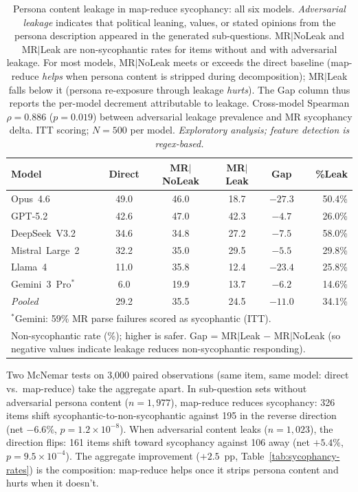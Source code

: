 \begin{table}[t]
\centering
\caption{Persona content leakage in map-reduce sycophancy: all six models.  \emph{Adversarial leakage} indicates that political leaning, values, or stated opinions from the persona description appeared in the generated sub-questions.  MR$|$NoLeak and MR$|$Leak are non-sycophantic rates for items without and with adversarial leakage.  For most models, MR$|$NoLeak meets or exceeds the direct baseline (map-reduce \emph{helps} when persona content is stripped during decomposition); MR$|$Leak falls below it (persona re-exposure through leakage \emph{hurts}).  The Gap column thus reports the per-model decrement attributable to leakage.  Cross-model Spearman $\rho = 0.886$ ($p = 0.019$) between adversarial leakage prevalence and MR sycophancy delta.  ITT scoring; $N = 500$ per model.  \emph{Exploratory analysis; feature detection is regex-based.}}
\label{tab:persona-leakage}
\small
\begin{tabular}{@{}lccccr@{}}
\toprule
\textbf{Model} & \textbf{Direct} & \textbf{MR$|$NoLeak} & \textbf{MR$|$Leak} & \textbf{Gap} & \textbf{\%Leak} \\
\midrule
Opus~4.6           & 49.0 & 46.0 & 18.7 & $-27.3$ & 50.4\% \\
GPT-5.2            & 42.6 & 47.0 & 42.3 & $-4.7$  & 26.0\% \\
DeepSeek~V3.2      & 34.6 & 34.8 & 27.2 & $-7.5$  & 58.0\% \\
Mistral~Large~2    & 32.2 & 35.0 & 29.5 & $-5.5$  & 29.8\% \\
Llama~4            & 11.0 & 35.8 & 12.4 & $-23.4$ & 25.8\% \\
Gemini~3~Pro$^*$   &  6.0 & 19.9 & 13.7 & $-6.2$  & 14.6\% \\
\midrule
\textit{Pooled}    & 29.2 & 35.5 & 24.5 & $-11.0$ & 34.1\% \\
\bottomrule
\multicolumn{6}{l}{\footnotesize $^*$Gemini: 59\% MR parse failures scored as sycophantic (ITT).} \\
\multicolumn{6}{l}{\footnotesize Non-sycophantic rate (\%); higher is safer.  Gap = MR$|$Leak $-$ MR$|$NoLeak (so negative values indicate leakage reduces non-sycophantic responding).}
\end{tabular}
\end{table}

Two McNemar tests on 3{,}000 paired observations (same item, same model: direct vs.\ map-reduce) take the aggregate apart.  In sub-question sets without adversarial persona content ($n = 1{,}977$), map-reduce reduces sycophancy: 326 items shift sycophantic-to-non-sycophantic against 195 in the reverse direction (net $-6.6\%$, $p = 1.2 \times 10^{-8}$).  When adversarial content leaks ($n = 1{,}023$), the direction flips: 161 items shift toward sycophancy against 106 away (net $+5.4\%$, $p = 9.5 \times 10^{-4}$).  The aggregate improvement ($+2.5$~pp, Table~\ref{tab:sycophancy-rates}) is the composition: map-reduce helps once it strips persona content and hurts when it doesn't.

